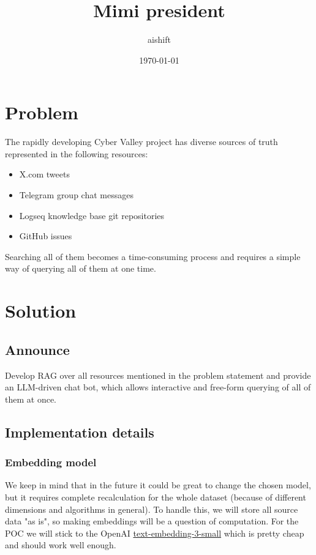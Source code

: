 \documentclass[11pt]{article}
\author{aishift}
\date{\today}
\title{Mimi president}
\begin{document}
\maketitle
\tableofcontents

\section{Problem}
\label{sec:org77751ae}

The rapidly developing Cyber Valley project has diverse sources of truth represented in the following resources:

\begin{itemize}
\item X.com tweets
\item Telegram group chat messages
\item Logseq knowledge base git repositories
\item GitHub issues
\end{itemize}

Searching all of them becomes a time-consuming process and requires a simple way of querying all of them at one time.
\section{Solution}
\label{sec:org17065b9}

\subsection{Announce}
\label{sec:org8be009c}

Develop RAG over all resources mentioned in the problem statement and provide an LLM-driven chat bot, which allows interactive and free-form querying of all of them at once.
\subsection{Implementation details}
\label{sec:org42e3bcf}

\subsubsection{Embedding model}
\label{sec:orgc90df8e}

We keep in mind that in the future it could be great to change the chosen model, but it requires complete recalculation for the whole dataset (because of different dimensions and algorithms in general). To handle this, we will store all source data "as is", so making embeddings will be a question of computation.
For the POC we will stick to the OpenAI \href{https://platform.openai.com/docs/guides/embeddings\#embedding-models}{text-embedding-3-small} which is pretty cheap and should work well enough.
\end{document}

